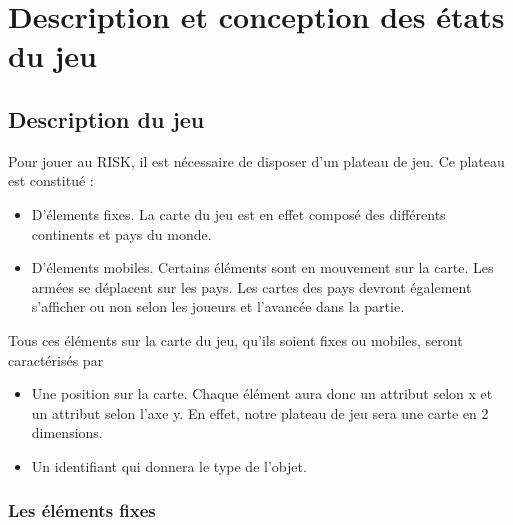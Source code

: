 \section{Description et conception des états du jeu}

\subsection{Description du jeu}

Pour jouer au RISK, il est nécessaire de disposer d'un plateau de jeu. Ce plateau est constitué : 

\begin{itemize}
    \item D'élements fixes. La carte du jeu est en effet composé des différents continents et pays du monde. 
    \item D'élements mobiles. Certains éléments sont en mouvement sur la carte. Les armées se déplacent sur les pays. Les cartes des pays devront également s'afficher ou non selon les joueurs et l'avancée dans la partie. 
    \newline
\end{itemize}


Tous ces éléments sur la carte du jeu, qu'ils soient fixes ou mobiles, seront caractérisés par 
\begin{itemize}
    \item Une position sur la carte. Chaque élément aura donc un attribut selon x et un attribut selon l'axe y. En effet, notre plateau de jeu sera une carte en 2 dimensions. 
    \item Un identifiant qui donnera le type de l'objet. 
\end{itemize}

\subsubsection{Les éléments fixes}

